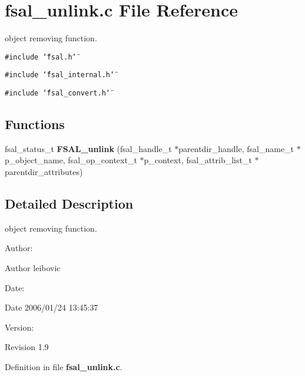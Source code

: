 \section{fsal\_\-unlink.c File Reference}
\label{fsal__unlink_8c}
object removing function. 

{\tt \#include \char`\"{}fsal.h\char`\"{}}\par
{\tt \#include \char`\"{}fsal\_\-internal.h\char`\"{}}\par
{\tt \#include \char`\"{}fsal\_\-convert.h\char`\"{}}\par
\subsection*{Functions}
\begin{CompactItemize}
\item 
fsal\_\-status\_\-t {\bf FSAL\_\-unlink} (fsal\_\-handle\_\-t $\ast$parentdir\_\-handle, fsal\_\-name\_\-t $\ast$p\_\-object\_\-name, fsal\_\-op\_\-context\_\-t $\ast$p\_\-context, fsal\_\-attrib\_\-list\_\-t $\ast$parentdir\_\-attributes)
\end{CompactItemize}


\subsection{Detailed Description}
object removing function. 

\begin{Desc}
\item[Author:]\begin{Desc}
\item[Author]leibovic \end{Desc}
\end{Desc}
\begin{Desc}
\item[Date:]\begin{Desc}
\item[Date]2006/01/24 13:45:37 \end{Desc}
\end{Desc}
\begin{Desc}
\item[Version:]\begin{Desc}
\item[Revision]1.9 \end{Desc}
\end{Desc}


Definition in file {\bf fsal\_\-unlink.c}.


